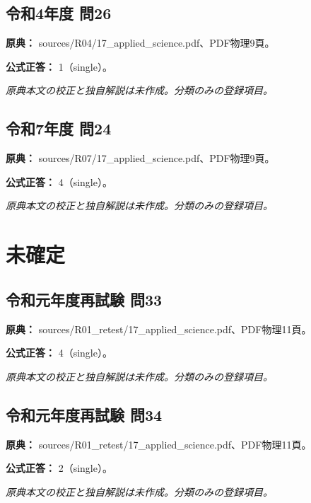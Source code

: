 \subsection{令和4年度 問26}
\label{q:r04-reg-applied-26}

\noindent\textbf{原典：} sources/R04/17\_applied\_science.pdf、PDF物理9頁。

\textbf{公式正答：} 1（single）。

\par\textit{原典本文の校正と独自解説は未作成。分類のみの登録項目。}

\subsection{令和7年度 問24}
\label{q:r07-reg-applied-24}

\noindent\textbf{原典：} sources/R07/17\_applied\_science.pdf、PDF物理9頁。

\textbf{公式正答：} 4（single）。

\par\textit{原典本文の校正と独自解説は未作成。分類のみの登録項目。}

\section{未確定}

\subsection{令和元年度再試験 問33}
\label{q:r01-ret-applied-33}

\noindent\textbf{原典：} sources/R01\_retest/17\_applied\_science.pdf、PDF物理11頁。

\textbf{公式正答：} 4（single）。

\par\textit{原典本文の校正と独自解説は未作成。分類のみの登録項目。}

\subsection{令和元年度再試験 問34}
\label{q:r01-ret-applied-34}

\noindent\textbf{原典：} sources/R01\_retest/17\_applied\_science.pdf、PDF物理11頁。

\textbf{公式正答：} 2（single）。

\par\textit{原典本文の校正と独自解説は未作成。分類のみの登録項目。}
